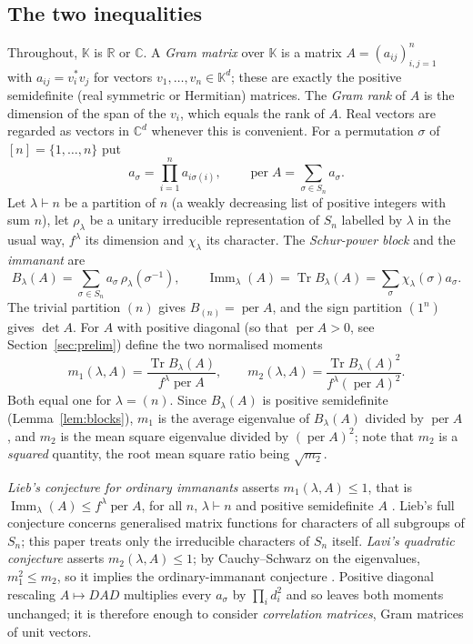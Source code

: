\documentclass[11pt,a4paper]{article}
\theoremstyle{remark}
\newcommand{\per}{\operatorname{per}}
\newcommand{\Tr}{\operatorname{Tr}}
\newcommand{\Imm}{\operatorname{Imm}}
\newcommand{\R}{\mathbb R}
\newcommand{\C}{\mathbb C}
\newcommand{\K}{\mathbb K}
\begin{document}
\subsection{The two inequalities}
Throughout, $\K$ is $\R$ or $\C$. A \emph{Gram matrix} over $\K$ is a matrix $A=(a_{ij})_{i,j=1}^n$ with $a_{ij}=v_i^*v_j$ for vectors $v_1,\dots,v_n\in\K^d$; these are exactly the positive semidefinite (real symmetric or Hermitian) matrices. The \emph{Gram rank} of $A$ is the dimension of the span of the $v_i$, which equals the rank of $A$. Real vectors are regarded as vectors in $\C^d$ whenever this is convenient. For a permutation $\sigma$ of $[n]=\{1,\dots,n\}$ put
\[
 a_\sigma=\prod_{i=1}^n a_{i\sigma(i)},\qquad \per A=\sum_{\sigma\in S_n}a_\sigma .
\]
Let $\lambda\vdash n$ be a partition of $n$ (a weakly decreasing list of positive integers with sum $n$), let $\rho_\lambda$ be a unitary irreducible representation of $S_n$ labelled by $\lambda$ in the usual way, $f^\lambda$ its dimension and $\chi_\lambda$ its character. The \emph{Schur-power block} and the \emph{immanant} are
\[
 B_\lambda(A)=\sum_{\sigma\in S_n}a_\sigma\,\rho_\lambda(\sigma^{-1}),\qquad
 \Imm_\lambda(A)=\Tr B_\lambda(A)=\sum_{\sigma}\chi_\lambda(\sigma)a_\sigma .
\]
The trivial partition $(n)$ gives $B_{(n)}=\per A$, and the sign partition $(1^n)$ gives $\det A$. For $A$ with positive diagonal (so that $\per A>0$, see Section~\ref{sec:prelim}) define the two normalised moments
\[
 m_1(\lambda,A)=\frac{\Tr B_\lambda(A)}{f^\lambda\per A},\qquad
 m_2(\lambda,A)=\frac{\Tr B_\lambda(A)^2}{f^\lambda(\per A)^2}.
\]
Both equal one for $\lambda=(n)$. Since $B_\lambda(A)$ is positive semidefinite (Lemma~\ref{lem:blocks}), $m_1$ is the average eigenvalue of $B_\lambda(A)$ divided by $\per A$, and $m_2$ is the mean square eigenvalue divided by $(\per A)^2$; note that $m_2$ is a \emph{squared} quantity, the root mean square ratio being $\sqrt{m_2}$.

\emph{Lieb's conjecture for ordinary immanants} asserts $m_1(\lambda,A)\le1$, that is $\Imm_\lambda(A)\le f^\lambda\per A$, for all $n$, $\lambda\vdash n$ and positive semidefinite $A$ \cite{Lieb,Wanless}. Lieb's full conjecture concerns generalised matrix functions for characters of all subgroups of $S_n$; this paper treats only the irreducible characters of $S_n$ itself. \emph{Lavi's quadratic conjecture} \cite[Conjecture~1.1]{Lavi} asserts $m_2(\lambda,A)\le1$; by Cauchy--Schwarz on the eigenvalues, $m_1^2\le m_2$, so it implies the ordinary-immanant conjecture \cite[Theorem~2.1]{Lavi}. Positive diagonal rescaling $A\mapsto DAD$ multiplies every $a_\sigma$ by $\prod_id_i^2$ and so leaves both moments unchanged; it is therefore enough to consider \emph{correlation matrices}, Gram matrices of unit vectors.
\end{document}
